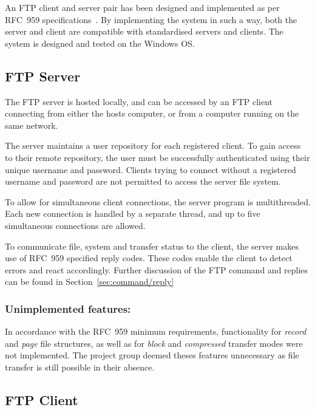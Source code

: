 \documentclass[10pt,twocolumn]{witseiepaper}
\begin{document}
An FTP client and server pair has been designed and implemented as per RFC~959 specifications~\cite{rfc959}. By implementing the system in such a way, both the server and client are compatible with standardised servers and clients. The system is designed and tested on the  Windows OS.

\subsection{FTP Server}

The FTP server is hosted locally, and can be accessed by an FTP client connecting from either the hosts computer, or from a computer running on the same network. 

The server maintains a user repository for each registered client. To gain access to their remote repository, the user must be successfully authenticated using their unique username and password. Clients trying to connect without a registered username and password are not permitted to access the server file system.


To allow for simultaneous client connections, the server program is multithreaded. Each new connection is handled by a separate thread, and up to five simultaneous connections are allowed. 

To communicate file, system and transfer status to the client, the server makes use of RFC~959 specified reply codes. These codes enable the client to detect errors and react accordingly. Further discussion of the FTP command and replies can be found in Section~\ref{sec:command/reply}

\vspace*{-2mm}
\subsubsection*{Unimplemented features: }
In accordance with the RFC~959 minimum requirements, functionality for \textit{record} and \textit{page} file structures, as well as for \textit{block} and \textit{compressed} transfer modes were not implemented. The project group deemed theses features unnecessary as file transfer is still possible in their absence.

\subsection{FTP Client}
\end{document}
